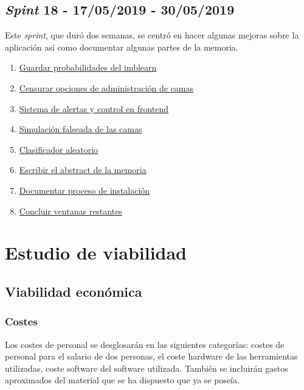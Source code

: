 \subsection{\textit{Spint} 18 - 17/05/2019 - 30/05/2019}
Este \textit{sprint}, que duró dos semanas, se centró en hacer algunas mejoras sobre la aplicación así como documentar algunas partes de la memoria.

\begin{enumerate}\addtocounter{enumi}{84}
	\item 
	\href{https://github.com/jlgarridol/TFG-SmartBeds/issues/85}{Guardar probabilidades del imblearn}
	\item 
	\href{https://github.com/jlgarridol/TFG-SmartBeds/issues/86}{Censurar opciones de administración de camas}
	\item 
	\href{https://github.com/jlgarridol/TFG-SmartBeds/issues/87}{Sistema de alertas y control en frontend}
	\item 
	\href{https://github.com/jlgarridol/TFG-SmartBeds/issues/88}{Simulación falseada de las camas}
	\item 
	\href{https://github.com/jlgarridol/TFG-SmartBeds/issues/89}{Clasificador aleatorio}
	\item 
	\href{https://github.com/jlgarridol/TFG-SmartBeds/issues/90}{Escribir el abstract de la memoria}
	\item 
	\href{https://github.com/jlgarridol/TFG-SmartBeds/issues/91}{Documentar proceso de instalación}
	\item 
	\href{https://github.com/jlgarridol/TFG-SmartBeds/issues/92}{Concluir ventanas restantes}
\end{enumerate}

\section{Estudio de viabilidad}

\subsection{Viabilidad económica}

\subsubsection{Costes}

Los costes de personal se desglosarán en las siguientes categorías: costes de personal para el salario de dos personas, el coste hardware de las herramientas utilizadas, coste software del software utilizada. También se incluirán gastos aproximados del material que se ha dispuesto que ya se poseía.

